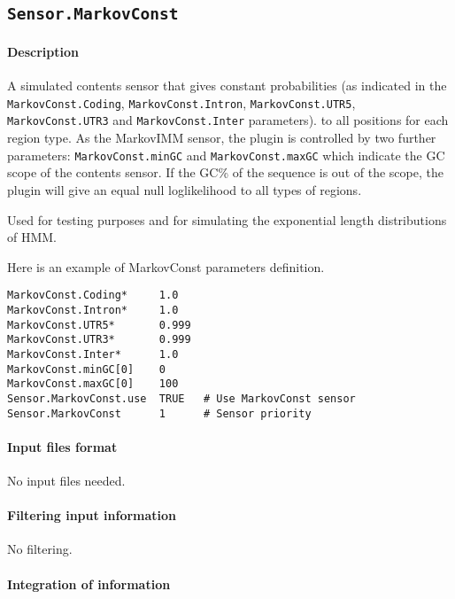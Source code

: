 
\subsection{\texttt{Sensor.MarkovConst}}

\paragraph{Description}

A simulated contents sensor that gives constant probabilities (as
indicated in the \texttt{MarkovConst.Coding},
\texttt{MarkovConst.Intron}, \texttt{MarkovConst.UTR5},
\texttt{MarkovConst.UTR3} and \texttt{MarkovConst.Inter} parameters).
to all positions for each region type. As the MarkovIMM sensor, the
plugin is controlled by two further parameters:
\texttt{MarkovConst.minGC} and \texttt{MarkovConst.maxGC} which
indicate the GC scope of the contents sensor. If the GC\% of the
sequence is out of the scope, the plugin will give an equal null
loglikelihood to all types of regions.

Used for testing purposes and for simulating the exponential length
distributions of HMM.

Here is an example of MarkovConst parameters definition.
\begin{Verbatim}[fontsize=\small]
MarkovConst.Coding*     1.0
MarkovConst.Intron*     1.0
MarkovConst.UTR5*       0.999
MarkovConst.UTR3*       0.999
MarkovConst.Inter*      1.0
MarkovConst.minGC[0]    0
MarkovConst.maxGC[0]    100
Sensor.MarkovConst.use  TRUE   # Use MarkovConst sensor
Sensor.MarkovConst      1      # Sensor priority
\end{Verbatim}

\paragraph{Input files format}

No input files  needed.

\paragraph{Filtering input information}

No filtering.

\paragraph{Integration of information}

